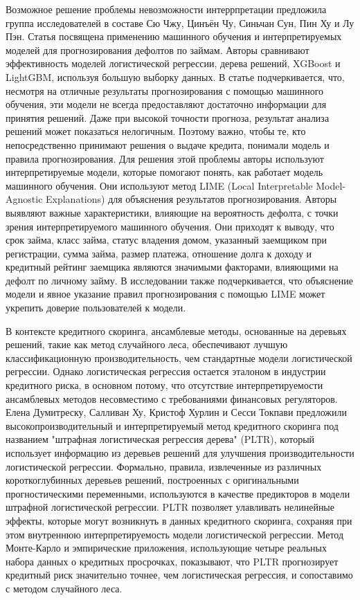 \documentclass[14pt, letterpaper, twoside]{extarticle}
\begin{document}
Возможное решение проблемы невозможности интеррпретации предложила группа исследователей в составе Сю Чжу, Цинъён Чу, Синьчан Сун, Пин Ху и Лу Пэн. Статья \cite{zhu2023explainable} посвящена применению машинного обучения и интерпретируемых моделей для прогнозирования дефолтов по займам. Авторы сравнивают эффективность моделей логистической регрессии, дерева решений, XGBoost и LightGBM, используя большую выборку данных. В статье подчеркивается, что, несмотря на отличные результаты прогнозирования с помощью машинного обучения, эти модели не всегда предоставляют достаточно информации для принятия решений. Даже при высокой точности прогноза, результат анализа решений может показаться нелогичным. Поэтому важно, чтобы те, кто непосредственно принимают решения о выдаче кредита, понимали модель и правила прогнозирования. Для решения этой проблемы авторы используют интерпретируемые модели, которые помогают понять, как работает модель машинного обучения. Они используют метод LIME (Local Interpretable Model-Agnostic Explanations) для объяснения результатов прогнозирования. Авторы выявляют важные характеристики, влияющие на вероятность дефолта, с точки зрения интерпретируемого машинного обучения. Они приходят к выводу, что срок займа, класс займа, статус владения домом, указанный заемщиком при регистрации, сумма займа, размер платежа, отношение долга к доходу и кредитный рейтинг заемщика являются значимыми факторами, влияющими на дефолт по личному займу.
В исследовании также подчеркивается, что объяснение модели и явное указание правил прогнозирования с помощью LIME может укрепить доверие пользователей к модели.


В контексте кредитного скоринга, ансамблевые методы, основанные на деревьях решений, такие как метод случайного леса, обеспечивают лучшую классификационную производительность, чем стандартные модели логистической регрессии. Однако логистическая регрессия остается эталоном в индустрии кредитного риска, в основном потому, что отсутствие интерпретируемости ансамблевых методов несовместимо с требованиями финансовых регуляторов. Елена Думитреску, Салливан Ху, Кристоф Хурлин и Сесси Токпави \cite{dumitrescu2022machine} предложили высокопроизводительный и интерпретируемый метод кредитного скоринга под названием "штрафная логистическая регрессия дерева" (PLTR), который использует информацию из деревьев решений для улучшения производительности логистической регрессии. Формально, правила, извлеченные из различных короткоглубинных деревьев решений, построенных с оригинальными прогностическими переменными, используются в качестве предикторов в модели штрафной логистической регрессии. PLTR позволяет улавливать нелинейные эффекты, которые могут возникнуть в данных кредитного скоринга, сохраняя при этом внутреннюю интерпретируемость модели логистической регрессии. Метод Монте-Карло и эмпирические приложения, использующие четыре реальных набора данных о кредитных просрочках, показывают, что PLTR прогнозирует кредитный риск значительно точнее, чем логистическая регрессия, и сопоставимо с методом случайного леса.
\end{document}
